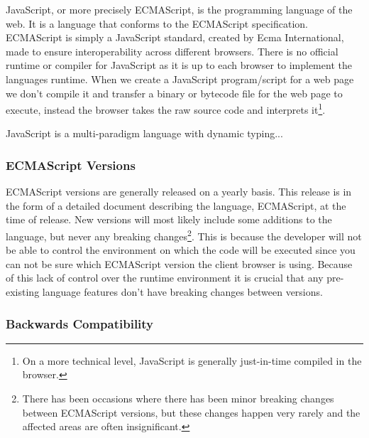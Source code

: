 JavaScript, or more precisely ECMAScript, is the programming language of the web.
It is a language that conforms to the ECMAScript specification.
ECMAScript is simply a JavaScript standard, created by Ecma International, made to ensure interoperability across different browsers.
There is no official runtime or compiler for JavaScript as it is up to each browser to implement the languages runtime.
When we create a JavaScript program/script for a web page we don't compile it and transfer a binary or bytecode file for the web page to execute, instead the browser takes the raw source code and interprets it\footnote{On a more technical level, JavaScript is generally just-in-time compiled in the browser.}.

JavaScript is a multi-paradigm language with dynamic typing...

\subsubsection{ECMAScript Versions}\label{subsubsec:ecmascript-versions}

ECMAScript versions are generally released on a yearly basis.
This release is in the form of a detailed document describing the language, ECMAScript, at the time of release.
New versions will most likely include some additions to the language, but never any breaking changes\footnote{There has been occasions where there has been minor breaking changes between ECMAScript versions, but these changes happen very rarely and the affected areas are often insignificant.}.
This is because the developer will not be able to control the environment on which the code will be executed since you can not be sure which ECMAScript version the client browser is using.
Because of this lack of control over the runtime environment it is crucial that any pre-existing language features don't have breaking changes between versions.

\subsubsection{Backwards Compatibility}\label{subsubsec:backwards-compatability}

